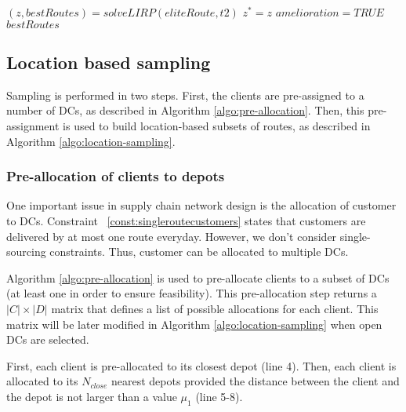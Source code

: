 \documentclass[a4paper,10pt]{article}
\begin{document}
\begin{linenumbers}
\begin{algorithm}
\begin{algorithmic}[1]
				\ENDFOR
			\ENDFOR
			\STATE 	$(z,bestRoutes) = solveLIRP(eliteRoute, t2)$
				\STATE $z^*=z$
				\STATE $amelioration =TRUE$
			\ENDIF
		\RETURN $bestRoutes$
	\end{algorithmic}
\end{algorithm}








\subsection{Location based sampling}

Sampling is performed in two steps.
First, the clients are pre-assigned to a number of DCs, as described in Algorithm \ref{algo:pre-allocation}.
Then, this pre-assignment is used to build location-based subsets of routes, as described in Algorithm \ref{algo:location-sampling}.

\subsubsection{Pre-allocation of clients to depots}

One important issue in supply chain network design is the allocation of customer to DCs. 
Constraint ~\eqref{const:singleroutecustomers} states that customers are delivered by at most one route everyday. However, we don't consider single-sourcing constraints. Thus, customer can be allocated to multiple DCs. 

Algorithm \ref{algo:pre-allocation} is used to pre-allocate clients to a subset of DCs (at least one in order to ensure feasibility). 
This pre-allocation step returns a $|C| \times |D|$ matrix that defines a list of possible allocations for each client. 
This matrix will be later modified in Algorithm \ref{algo:location-sampling} when open DCs are selected. 

First, each client is pre-allocated to its closest depot (line 4). 
Then, each client is allocated to its $N_{close}$ nearest depots provided the distance between the client and the depot is not larger than a value $\mu_1$ (line 5-8).


\end{linenumbers}
\end{document}
